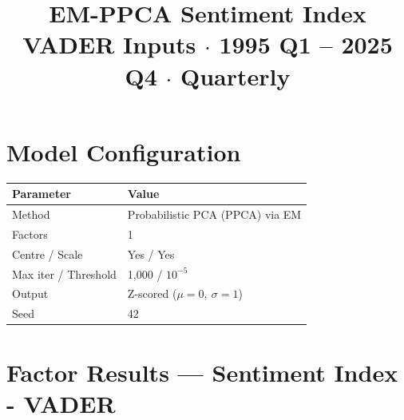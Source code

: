 \documentclass[10pt]{article}
\title{\textbf{EM-PPCA Sentiment Index}\\[3pt]
       \normalsize VADER Inputs $\cdot$ 1995 Q1 -- 2025 Q4 $\cdot$ Quarterly}
\date{}
\begin{document}
\maketitle
\vspace{-1em}

\section*{Model Configuration}

\begin{table}[h!]
\centering
\begin{tabular}{ll}
\toprule
\textbf{Parameter}   & \textbf{Value} \\
\midrule
\rowcolor{rowgray}
Method               & Probabilistic PCA (PPCA) via EM \\
Factors              & 1 \\
\rowcolor{rowgray}
Centre / Scale       & Yes / Yes \\
Max iter / Threshold & 1{,}000 \;/\; $10^{-5}$ \\
\rowcolor{rowgray}
Output               & Z-scored ($\mu=0,\ \sigma=1$) \\
Seed                 & 42 \\
\bottomrule
\end{tabular}
\end{table}

\bigskip

\section*{Factor Results --- Sentiment Index - VADER}
\end{document}
